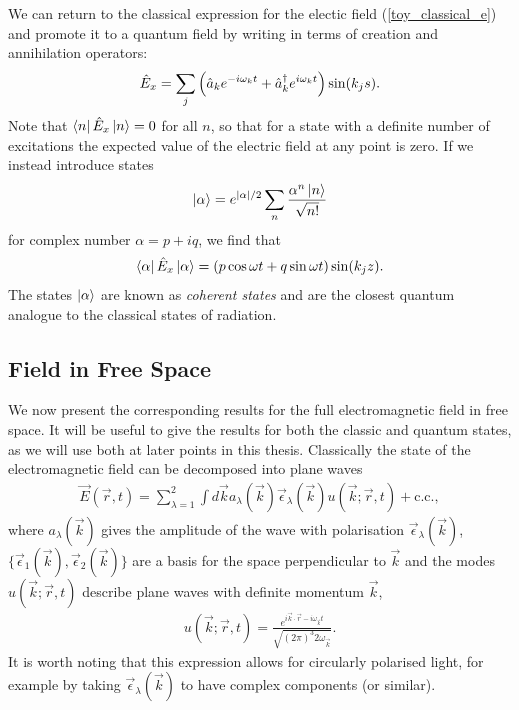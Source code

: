 We can return to the classical expression for the electic field (\ref{toy_classical_e}) and promote it to a quantum field by writing in terms of creation and annihilation operators:
\begin{align}
  \hat{E}_x = \sum_j \left(\hat{a}_k e^{-i\omega_k t} + \hat{a}^\dagger_k e^{i\omega_k t}\right) \sin(k_j s).
\end{align}
Note that $\left\langle n\right\vert\hat{E}_x\left\vert n\right\rangle = 0$ for all $n$, so that for a state with a definite number of excitations the expected value of the electric field at any point is zero. If we instead introduce states
\begin{align}
  \left\vert\alpha\right\rangle = e^{|\alpha|/2}\sum_n \frac{\alpha^n \left\vert n\right\rangle}{\sqrt{n!}}
\end{align}
for complex number $\alpha = p + iq$, we find that
\begin{align}
  \left\langle \alpha\right\vert\hat{E}_x\left\vert\alpha\right\rangle = (p\cos\omega t + q\sin\omega t)\sin(k_j z).
\end{align}
The states $\left\vert\alpha\right\rangle$ are known as \textit{coherent states} and are the closest quantum analogue to the classical states of radiation.

\subsection{Field in Free Space}

We now present the corresponding results for the full electromagnetic field in free space. It will be useful to give the results for both the classic and quantum states, as we will use both at later points in this thesis.  Classically the state of the electromagnetic field can be decomposed into plane waves 
\begin{align}
  \vec{E}(\vec{r}, t) = \sum_{\lambda = 1}^2 \int d\vec{k} a_\lambda(\vec{k})\vec{\epsilon}_\lambda(\vec{k}) u(\vec{k}; \vec{r}, t) + \text{c.c.},
\end{align}
where $a_\lambda(\vec{k})$ gives the amplitude of the wave with polarisation $\vec{\epsilon}_\lambda(\vec{k})$, $\{\vec{\epsilon}_1(\vec{k}), \vec{\epsilon}_2(\vec{k})\}$ are a basis for the space perpendicular to $\vec{k}$ and the modes $u(\vec{k}; \vec{r}, t)$ describe plane waves with definite momentum $\vec{k}$,
\begin{align}
  u(\vec{k}; \vec{r}, t) = \frac{e^{i\vec{k} \cdot \vec{r} - i\omega_\vec{k} t}}{\sqrt{(2\pi)^3 2\omega_\vec{k}}}.
\end{align}
It is worth noting that this expression allows for circularly polarised light, for example by taking $\vec{\epsilon}_\lambda(\vec{k})$ to have complex components (or similar).

